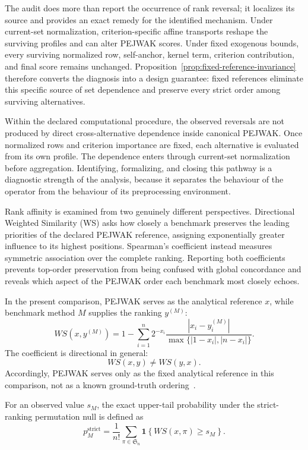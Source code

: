 \documentclass[reqno,11pt]{amsart}
\theoremstyle{definition}
\theoremstyle{plain}
\theoremstyle{remark}
\begin{document}
The audit does more than report the occurrence of rank reversal; it
localizes its source and provides an exact remedy for the identified
mechanism. Under current-set normalization, criterion-specific affine
transports reshape the surviving profiles and can alter PEJWAK scores.
Under fixed exogenous bounds, every surviving normalized row, self-anchor,
kernel term, criterion contribution, and final score remains unchanged.
Proposition~\ref{prop:fixed-reference-invariance} therefore converts the
diagnosis into a design guarantee: fixed references eliminate this
specific source of set dependence and preserve every strict order among
surviving alternatives.

Within the declared computational procedure, the observed reversals are
not produced by direct cross-alternative dependence inside canonical
PEJWAK. Once normalized rows and criterion importance are fixed, each
alternative is evaluated from its own profile. The dependence enters
through current-set normalization before aggregation. Identifying,
formalizing, and closing this pathway is a diagnostic strength of the
analysis, because it separates the behaviour of the operator from the
behaviour of its preprocessing environment.

\label{subsec:rank-affinity}

Rank affinity is examined from two genuinely different perspectives.
Directional Weighted Similarity (WS) asks how closely a benchmark
preserves the leading priorities of the declared PEJWAK reference,
assigning exponentially greater influence to its highest positions.
Spearman's coefficient instead measures symmetric association over the
complete ranking. Reporting both coefficients prevents top-order
preservation from being confused with global concordance and reveals
which aspect of the PEJWAK order each benchmark most closely echoes.

In the present comparison, PEJWAK serves as the analytical reference $x$, while
benchmark method $M$ supplies the ranking $y^{(M)}$:
\begin{equation}
WS(x,y^{(M)})
=
1-
\sum_{i=1}^{n}
2^{-x_i}
\frac{|x_i-y_i^{(M)}|}
{\max\{|1-x_i|,|n-x_i|\}}.
\label{eq:ws}
\end{equation}
The coefficient is directional in general:
\[
WS(x,y)\neq WS(y,x).
\]
Accordingly, PEJWAK serves only as the fixed analytical reference in this
comparison, not as a known ground-truth ordering~\cite{Salabun2020}.

For an observed value $s_M$, the exact upper-tail probability under the
strict-ranking permutation null is defined as
\begin{equation}
p_M^{\mathrm{strict}}
=
\frac{1}{n!}
\sum_{\pi\in\mathfrak S_n}
\mathbf{1}
\left\{
WS(x,\pi)\geq s_M
\right\}.
\label{eq:ssd-exact-tail}
\end{equation}
\end{document}

